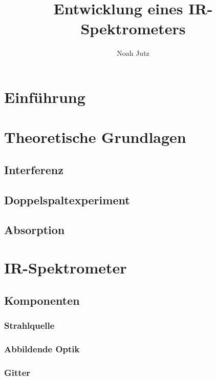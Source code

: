 \documentclass{article}
\title{Entwicklung eines IR-Spektrometers}
\author{Noah Jutz}
\date{}
\begin{document}
\maketitle

\tableofcontents

\section{Einführung}


\section{Theoretische Grundlagen}

\subsection{Interferenz}

\subsection{Doppelspaltexperiment}

\subsection{Absorption}

\section{IR-Spektrometer}

\subsection{Komponenten}

\subsubsection{Strahlquelle}

\subsubsection{Abbildende Optik}

\subsubsection{Gitter}
\end{document}
